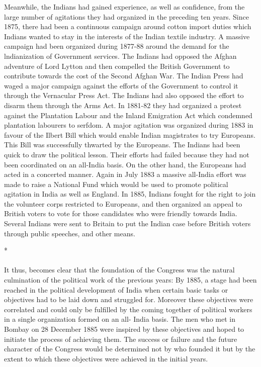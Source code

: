Meanwhile, the Indians had gained experience, as well as confidence, from the large number of agitations they had organized in the preceding ten years. Since 1875, there had been a continuous campaign around cotton import duties which Indians wanted to stay in the interests of the Indian textile industry. A massive campaign had been organized during 1877-88 around the demand for the lndianization of Government services. The Indians had opposed the Afghan adventure of Lord Lytton and then compelled the British Government to contribute towards the cost of the Second Afghan War. The Indian Press had waged a major campaign against the efforts of the Government to control it through the Vernacular Press Act. The Indians had also opposed the effort to disarm them through the Arms Act. In 1881-82 they had organized a protest against the Plantation Labour and the Inland Emigration Act which condemned plantation labourers to serfdom. A major agitation was organized during 1883 in favour of the Ilbert Bill which would enable Indian magistrates to try Europeans. This Bill was successfully thwarted by the Europeans. The Indians had been quick to draw the political lesson. Their efforts had failed because they had not been coordinated on an all-India basis. On the other hand, the Europeans had acted in a concerted manner. Again in July 1883 a massive all-India effort was made to raise a National Fund which would be used to promote political agitation in India as well as England. In 1885, Indians fought for the right to join the volunteer corps restricted to Europeans, and then organized an appeal to British voters to vote for those candidates who were friendly towards India. Several Indians were sent to Britain to put the Indian case before British voters through public speeches, and other means.

\begin{center}*\end{center}

\paragraph*{}


It thus, becomes clear that the foundation of the Congress was the natural culmination of the political work of the previous years: By 1885, a stage had been reached in the political development of India when certain basic tasks or objectives had to be laid down and struggled for. Moreover these objectives were correlated and could only be fulfilled by the coming together of political workers in a single organization formed on an all- India basis. The men who met in Bombay on 28 December 1885 were inspired by these objectives and hoped to initiate the process of achieving them. The success or failure and the future character of the Congress would be determined not by who founded it but by the extent to which these objectives were achieved in the initial years.

